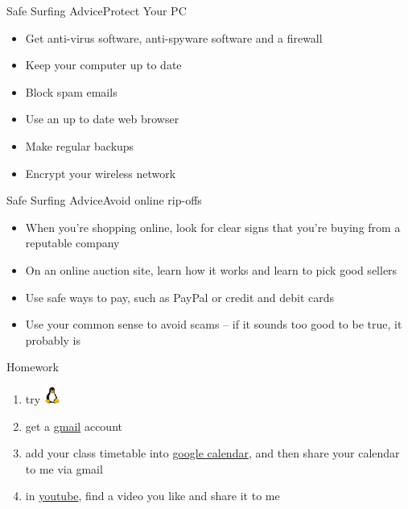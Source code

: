 \begin{frame}{Safe Surfing Advice}{Protect Your PC}
  \begin{itemize}
  \item Get anti-virus software, anti-spyware software and a firewall
  \item Keep your computer up to date
  \item Block spam emails
  \item Use an up to date web browser
  \item Make regular backups
  \item Encrypt your wireless network
  \end{itemize}
\end{frame}

\begin{frame}{Safe Surfing Advice}{Avoid online rip-offs}
  \begin{itemize}
  \item When you're shopping online, look for clear signs that you're buying from a reputable
    company
  \item On an online auction site, learn how it works and learn to pick good sellers
  \item Use safe ways to pay, such as PayPal or credit and debit cards
  \item Use your common sense to avoid scams – if it sounds too good to be true, it probably is
  \end{itemize}
\end{frame}

\begin{frame}{Homework}
  \begin{enumerate}
  \item try \includegraphics[height=1.5em]{linuxlogo}
  \item get a \href{https://mail.google.com}{gmail} account
  \item add your class timetable into \href{https://calendar.google.com}{google calendar},
    and then share your calendar to me via gmail
  \item in \href{https://youtube.com}{youtube}, find a video you like and share it to me
  \end{enumerate}
\end{frame}


